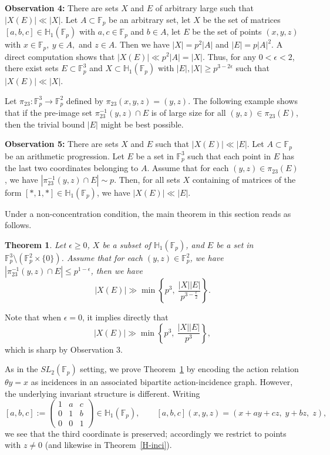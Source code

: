 \documentclass[11pt]{article}
\newtheorem{theorem}{Theorem}[section]
\def\F{\mathcal{F}}
\def\Fbb{\mathbb{F}}
\def \F{{\mathbb F}}
\def\SL{SL}
\begin{document}
{\bf Observation 4:} There are sets $X$ and $E$ of arbitrary large such that $|X(E)|\ll |X|$. Let $A\subset\mathbb{F}_p$ be an arbitrary set, let $X$ be the set of matrices $[a,b,c]\in \mathbb{H}_1(\Fbb_p)$ with $a, c\in \mathbb{F}_p$ and $b\in A$, let $E$ be the set of points $(x, y, z)$ with $x\in \mathbb{F}_p,~ y\in A,$ and $z\in A$. Then we have $|X|=p^2|A|$ and $|E|=p|A|^2$. A direct computation shows that $|X(E)|\ll p^2|A|= |X|$. Thus, for any $0<\epsilon<2$, there exist sets $E\subset \mathbb{F}_p^3$ and $X\subset \mathbb{H}_1(\mathbb{F}_p)$ with $|E|, |X|\ge p^{3-2\epsilon}$ such that $|X(E)|\ll |X|$.

Let $\pi_{23}\colon \mathbb{F}_p^3\to \mathbb{F}_p^2$ defined by $\pi_{23}(x, y, z)=(y, z)$. The following example shows that if the pre-image set $\pi_{23}^{-1}(y, z)\cap E$ is of large size for all $(y, z)\in \pi_{23}(E)$, then the trivial bound $|E|$ might be best possible.

{\bf Observation 5:} There are sets $X$ and $E$ such that $|X(E)|\ll |E|$. Let $A\subset\mathbb{F}_p$ be an arithmetic progression. Let $E$ be a set in $\mathbb{F}_p^3$ such that each point in $E$ has the last two coordinates belonging to $A$. Assume that for each $(y, z)\in \pi_{23}(E)$, we have $|\pi_{23}^{-1}(y, z)\cap E|\sim p$. Then, for all sets $X$ containing of matrices of the form $[*, 1, *]\in \mathbb{H}_1(\Fbb_p)$, we have $|X(E)|\ll |E|$. 

Under a non-concentration condition, the main theorem in this section reads as follows. 

\begin{theorem}\label{main-H}
Let $\epsilon\ge 0$, $X$ be a subset of $\mathbb{H}_1(\Fbb_p)$, and $E$ be a set in $\mathbb{F}_p^3\setminus (\mathbb{F}_p^2\times \{0\})$. Assume that for each $(y, z)\in \mathbb{F}_p^2$, we have $|\pi_{23}^{-1}(y, z)\cap E|\le p^{1-\epsilon}$, then we have
\[|X(E)|\gg \min \left\lbrace p^3, ~\frac{|X||E|}{p^{3-\frac{\epsilon}{2}}} \right\rbrace.\]
\end{theorem}

Note that when $\epsilon=0$, it implies directly that 
\[|X(E)|\gg \min \left\lbrace p^3, ~\frac{|X||E|}{p^{3}} \right\rbrace,\]
which is sharp by Observation 3. 

As in the $\SL_2(\F_p)$ setting, we prove Theorem~\ref{main-H} by encoding the action relation
$\theta y=x$ as incidences in an associated bipartite action-incidence graph. However, the
underlying invariant structure is different.  Writing
\[
[a,b,c]:=\begin{pmatrix}1&a&c\\ 0&1&b\\ 0&0&1\end{pmatrix}\in \mathbb{H}_1(\F_p),
\qquad
[a,b,c](x,y,z)=(x+ay+cz,\; y+bz,\; z),
\]
we see that the third coordinate is preserved; accordingly we restrict to points with $z\neq 0$
(and likewise in Theorem~\ref{H-inci}).
\end{document}
